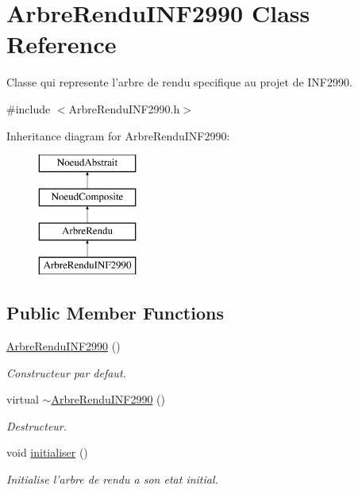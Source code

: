 \hypertarget{class_arbre_rendu_i_n_f2990}{\section{Arbre\-Rendu\-I\-N\-F2990 Class Reference}
\label{class_arbre_rendu_i_n_f2990}
}


Classe qui represente l'arbre de rendu specifique au projet de I\-N\-F2990.  




{\ttfamily \#include $<$Arbre\-Rendu\-I\-N\-F2990.\-h$>$}

Inheritance diagram for Arbre\-Rendu\-I\-N\-F2990\-:\begin{figure}[H]
\begin{center}
\leavevmode
\includegraphics[height=4.000000cm]{class_arbre_rendu_i_n_f2990}
\end{center}
\end{figure}
\subsection*{Public Member Functions}
\begin{DoxyCompactItemize}
\item 
\hyperlink{group__inf2990_ga67528b7fa54e8ef8f96ef2e0bad06d2d}{Arbre\-Rendu\-I\-N\-F2990} ()
\begin{DoxyCompactList}\small\item\em Constructeur par defaut. \end{DoxyCompactList}\item 
virtual \hyperlink{group__inf2990_gaa67526b2fd719f6bcef7a4547bd25c7b}{$\sim$\-Arbre\-Rendu\-I\-N\-F2990} ()
\begin{DoxyCompactList}\small\item\em Destructeur. \end{DoxyCompactList}\item 
void \hyperlink{group__inf2990_ga678d89e1f12ae16ee7dcf6de3db637a3}{initialiser} ()
\begin{DoxyCompactList}\small\item\em Initialise l'arbre de rendu a son etat initial. \end{DoxyCompactList}\end{DoxyCompactItemize}
